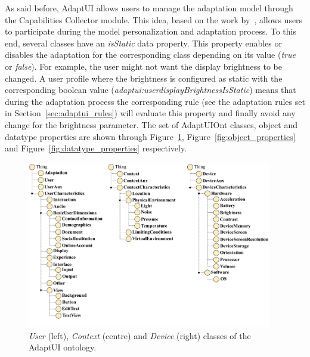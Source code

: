 % 


As said before, AdaptUI allows users to manage the adaptation model through the
Capabilities Collector module. This idea, based on the work by~\citet{razmerita_ontology_based_2003},
allows users to participate during the model personalization and adaptation process. 
To this end, several classes have an \textit{isStatic} data property. This property
enables or disables the adaptation for the corresponding class depending on its
value (\textit{true} or \textit{false}). For example, the user might not want the
display brightness to be changed. A user profile where the brightness is configured
as static with the corresponding boolean value (\textit{adaptui:userdisplayBrightnessIsStatic})
means that during the adaptation process the corresponding rule (see the adaptation
rules set in Section~\ref{sec:adaptui_rules}) will evaluate this property
and finally avoid any change for the brightness parameter. The set of AdaptUIOnt
classes, object and datatype properties are shown through Figure~\ref{fig:classes},
Figure~\ref{fig:object_properties} and Figure~\ref{fig:datatype_properties}
respectively.

\begin{figure}
\centering
\includegraphics[width=0.95\textwidth]{../figures/PDF/classes.pdf}
\caption{\textit{User} (left), \textit{Context} (centre)
and \textit{Device} (right) classes of the AdaptUI ontology.}
\label{fig:classes}
\end{figure}


